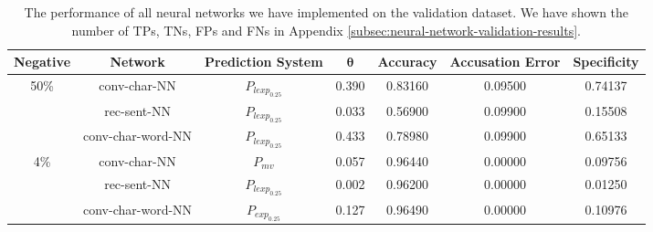 \begin{table}[h]
    \begin{adjustbox}{center}
    \scriptsize
    \begin{tabular}{|c|c|c|c|c|c|c|}
        \hline
        \textbf{Negative} & \textbf{Network}  & \textbf{Prediction System} &
        $\mathbf{\theta}$ & \textbf{Accuracy} & \textbf{Accusation Error}  & 
        \textbf{Specificity} \\ \hline
        \multirow{3}{*}{50\%}  & \gls{conv-char-NN}      & $P_{lexp_{0.25}}$ &
        0.390                  & 0.83160                 & 0.09500           &
        0.74137
        \\
        \cline{2-7}            & \gls{rec-sent-NN}       & $P_{lexp_{0.25}}$ &
        0.033                  & 0.56900                 & 0.09900           &
        0.15508
        \\
        \cline{2-7}            & \gls{conv-char-word-NN} & $P_{lexp_{0.25}}$ &
        0.433                  & 0.78980                 & 0.09900           &
        0.65133
        \\ \hline
        \multirow{3}{*}{4\%}   & \gls{conv-char-NN}      & $P_{mv}$          &
        0.057                  & 0.96440                 & 0.00000           &
        0.09756
        \\
        \cline{2-7}            & \gls{rec-sent-NN}       & $P_{lexp_{0.25}}$ &
        0.002                  & 0.96200                 & 0.00000           &
        0.01250
        \\
        \cline{2-7}            & \gls{conv-char-word-NN} & $P_{exp_{0.25}}$  &
        0.127                  & 0.96490                 & 0.00000           &
        0.10976
        \\ \hline
    \end{tabular}
    \end{adjustbox}
    \caption{The performance of all neural networks we have implemented on the
        validation dataset. We have shown the number of \glspl{TP}, \glspl{TN},
        \glspl{FP} and \glspl{FN} in Appendix
        \ref{subsec:neural-network-validation-results}.}
    \label{tab:experiment-validation-results}
\end{table}
